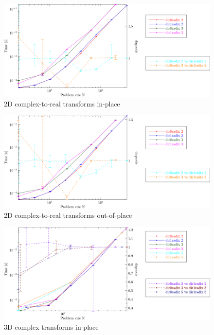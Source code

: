 \documentclass[12pt]{article}
\begin{document}
\centering
\begin{figure}[htbp]
   \includegraphics[width=\textwidth]{2d_c2rinplace_double.pdf}
   \caption{2D complex-to-real transforms in-place}
\end{figure}
\clearpage

\centering
\begin{figure}[htbp]
   \includegraphics[width=\textwidth]{2d_c2routofplace_double.pdf}
   \caption{2D complex-to-real transforms out-of-place}
\end{figure}

\centering
\begin{figure}[htbp]
   \includegraphics[width=\textwidth]{3d_c2cinplace_double.pdf}
   \caption{3D complex transforms in-place}
\end{figure}
\clearpage
\end{document}
